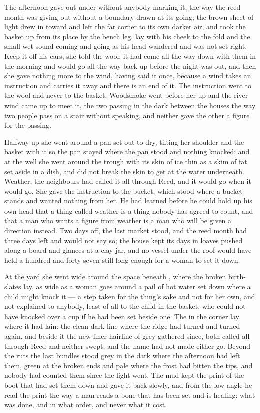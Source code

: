 The afternoon gave out under  without anybody marking it, the way the reed month was giving out without a boundary drawn at its going; the brown sheet of light drew in toward  and left the far corner to its own darker air, and  took the basket up from its place by the bench leg.  lay with his cheek to the fold and the small wet sound coming and going as his head wandered and was not set right. Keep it off his ears, she told the wool; it had come all the way down with them in the morning and would go all the way back up before the night was out, and then she gave nothing more to the wind, having said it once, because a wind takes an instruction and carries it away and there is an end of it. The instruction went to the wool and never to the basket. Woodsmoke went before her up  and the river wind came up to meet it, the two passing in the dark between the houses the way two people pass on a stair without speaking, and neither gave the other a figure for the passing.

Halfway up she went around a pan set out to dry, tilting her shoulder and the basket with it so the pan stayed where the pan stood and nothing knocked; and at the well she went around the trough with its skin of ice thin as a skim of fat set aside in a dish, and did not break the skin to get at the water underneath. Weather, the neighbours had called it all through Reed, and it would go when it would go. She gave the instruction to the bucket, which stood where a bucket stands and wanted nothing from her. He had learned before he could hold up his own head that a thing called weather is a thing nobody has agreed to count, and that a man who wants a figure from weather is a man who will be given a direction instead. Two days off, the last market stood, and the reed month had three days left and would not say so; the house kept its days in loaves pushed along a board and glances at a clay jar, and no vessel under the roof would have held a hundred and forty-seven still long enough for a woman to set it down.

At the yard she went wide around the space beneath , where the broken birth-slates lay, as wide as a woman goes around a pail of hot water set down where a child might knock it --- a step taken for the thing's sake and not for her own, and not explained to anybody, least of all to the child in the basket, who could not have knocked over a cup if he had been set beside one. The  in the corner lay where it had lain: the clean dark line where the ridge had turned and turned again, and beside it the new finer hairline of grey gathered since, both called  all through Reed and neither swept, and the name had not made either go. Beyond the ruts the last bundles stood grey in the dark where the afternoon had left them, green at the broken ends and pale where the frost had bitten the tips, and nobody had counted them since the light went. The mud kept the print of the boot that had set them down and gave it back slowly, and from the low angle he read the print the way a man reads a bone that has been set and is healing: what was done, and in what order, and never what it cost.

